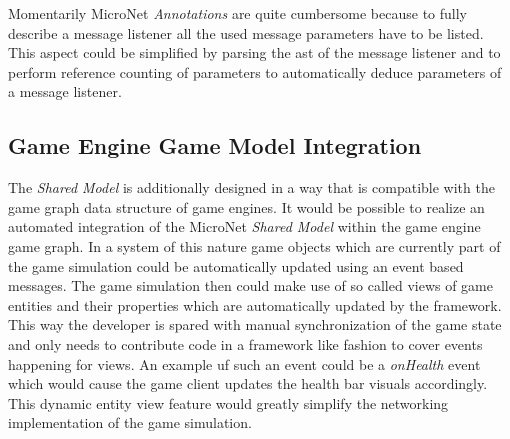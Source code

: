 Momentarily MicroNet \textit{Annotations} are quite cumbersome because to fully
describe a message listener all the used message parameters have to be listed.
This aspect could be simplified by parsing the \gls{ast} of the message listener
and to perform reference counting of parameters to automatically deduce
parameters of a message listener.

\subsection{Game Engine Game Model Integration}

The \textit{Shared Model} is additionally designed in a way that is compatible
with the game graph data structure of game engines. It would be possible to
realize an automated integration of the MicroNet \textit{Shared Model} within
the game engine game graph. In a system of this nature game objects which are
currently part of the game simulation could be automatically updated using an
event based messages. The game simulation then could make use of so called views
of game entities and their properties which are automatically updated by the
framework. This way the developer is spared with manual synchronization of the
game state and only needs to contribute code in a framework like fashion to
cover events happening for views. An example uf such an event could be a
\textit{onHealth} event which would cause the game client updates the health bar
visuals accordingly. This dynamic entity view feature would greatly simplify the
networking implementation of the game simulation.
